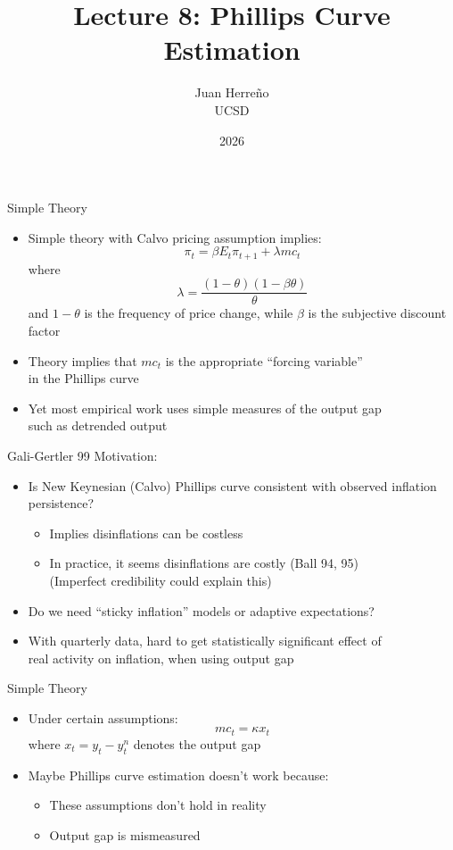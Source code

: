 \documentclass[11pt,aspectratio=169,xcolor={dvipsnames},hyperref={pdftex,pdfpagemode=UseNone,hidelinks,pdfdisplaydoctitle=true},usepdftitle=false]{beamer}
\title{Lecture 8: Phillips Curve Estimation}
\author{Juan Herre\~{n}o\\UCSD}
\date{2026}
\begin{document}
\maketitle


\begin{frame}{Simple Theory}
\begin{itemize}
\itemsep1em 
\item Simple theory with Calvo pricing assumption implies:
\[ \pi_{t} = \beta E_{t} \pi_{t+1} + \lambda mc_{t} \]
where
\[ \lambda = \frac{(1-\theta)(1-\beta\theta)}{\theta} \]
and $1-\theta$ is the frequency of price change, while $\beta$ is the subjective discount factor
\item Theory implies that $mc_{t}$ is the appropriate ``forcing variable'' \\ in the Phillips curve
\item Yet most empirical work uses simple measures of the output gap \\ such as detrended output
\end{itemize}
\end{frame}

\begin{frame}{Gali-Gertler 99}
	Motivation:
	\begin{itemize}
		\itemsep1em 
		\item Is New Keynesian (Calvo) Phillips curve consistent with observed inflation persistence?
		\begin{itemize}
			\item Implies disinflations can be costless
			\item In practice, it seems disinflations are costly (Ball 94, 95) \\ (Imperfect credibility could explain this)
		\end{itemize}
		\item Do we need ``sticky inflation'' models or adaptive expectations?
		\item With quarterly data, hard to get statistically significant effect of \\ real activity on inflation, when using output gap
	\end{itemize}
\end{frame}

\begin{frame}{Simple Theory}
\begin{itemize}
\itemsep1em 
\item Under certain assumptions:
\[ mc_{t} = \kappa x_{t} \]
where $x_{t} = y_{t} - y_{t}^{n}$ denotes the output gap
\item Maybe Phillips curve estimation doesn't work because:
\begin{itemize}
\item These assumptions don't hold in reality
\item Output gap is mismeasured
\end{itemize}
\end{itemize}
\end{frame}
\end{document}
